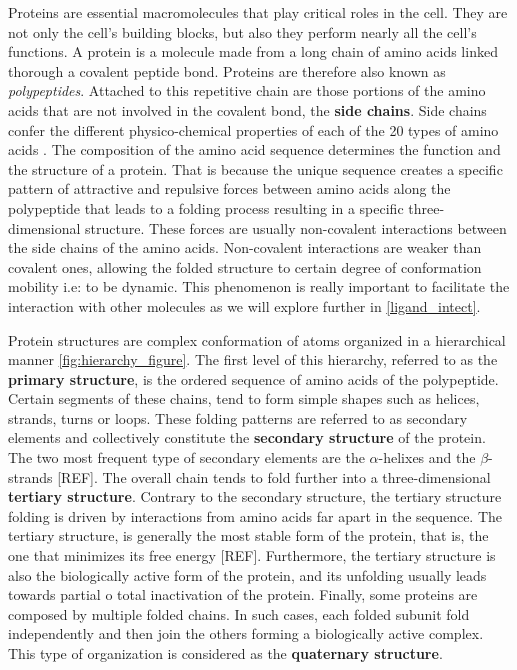 \documentclass[12pt, a4paper,twoside]{tesi_upf}
\begin{document}
\par Proteins are essential macromolecules that play critical roles in the cell. They are not only the cell's building blocks, but also they perform nearly all the cell's functions.  A protein is a molecule made from a long chain of amino acids linked thorough a covalent peptide bond. Proteins are therefore also known as \textit{polypeptides}. Attached to this repetitive chain are those portions of the amino acids that are not involved in the covalent bond, the \textbf{side chains}. Side chains confer the different physico-chemical properties of each of the 20 types of amino acids \cite{thecell2008}. The composition of the amino acid sequence determines the function and the structure of a protein. That is because the unique sequence creates a specific pattern of attractive and repulsive forces between amino acids along the polypeptide that leads to a folding process resulting in a specific three-dimensional structure. These forces are usually non-covalent  interactions between the side chains of the amino acids. Non-covalent interactions are weaker than covalent ones, allowing the folded structure to certain degree of  conformation mobility i.e: to be dynamic. This phenomenon is really important to facilitate the interaction with other molecules as we will explore further in \ref{ligand_intect}.  

\par Protein structures are complex conformation of atoms organized in a hierarchical manner \ref{fig:hierarchy_figure}. The first level of this hierarchy, referred to as the \textbf{primary structure}, is the ordered sequence of amino acids of the polypeptide. Certain segments of these chains, tend to form simple shapes such as helices, strands, turns or loops.  These folding patterns are referred to as secondary elements and collectively constitute the \textbf{secondary structure} of the protein. The two most frequent type of secondary elements are the $\alpha$-helixes and the $\beta$-strands [REF]. The overall chain tends to fold further into a three-dimensional  \textbf{tertiary structure}. Contrary to the secondary structure, the tertiary structure folding is driven by interactions from amino acids far apart in the sequence. The tertiary structure, is generally the most stable form of the protein, that is, the one that minimizes its free energy [REF]. Furthermore, the tertiary structure is also the biologically active form of the protein, and its unfolding usually leads towards partial o total inactivation of the protein. Finally, some proteins are composed by multiple folded chains. In such cases, each folded subunit fold independently and then join the others forming a biologically active complex. This type of organization is considered as the \textbf{quaternary structure}.
\end{document}
